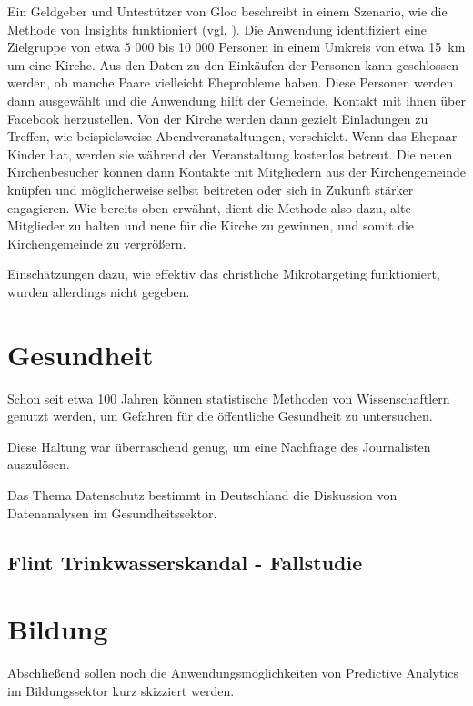 Ein Geldgeber und Untestützer von Gloo beschreibt in einem Szenario, wie die Methode von Insights funktioniert (vgl. \cite{Viken}).
Die Anwendung identifiziert eine Zielgruppe von etwa 5 000 bis 10 000 Personen in einem Umkreis von etwa 15~km um eine Kirche.
Aus den Daten zu den Einkäufen der Personen kann geschlossen werden, ob manche Paare vielleicht Eheprobleme haben.
Diese Personen werden dann ausgewählt und die Anwendung hilft der Gemeinde, Kontakt mit ihnen über Facebook herzustellen.
Von der Kirche werden dann gezielt Einladungen zu Treffen, wie beispielsweise Abendveranstaltungen, verschickt. Wenn das Ehepaar
Kinder hat, werden sie während der Veranstaltung kostenlos betreut. Die neuen Kirchenbesucher können dann Kontakte mit
Mitgliedern aus der Kirchengemeinde knüpfen und möglicherweise selbst beitreten oder sich in Zukunft stärker engagieren.
Wie bereits oben erwähnt, dient die Methode also dazu, alte Mitglieder zu halten und neue für die Kirche zu gewinnen,
und somit die Kirchengemeinde zu vergrößern.

Einschätzungen dazu, wie effektiv das christliche Mikrotargeting funktioniert, wurden allerdings nicht gegeben.

\section{Gesundheit}

Schon seit etwa 100 Jahren können statistische Methoden von Wissenschaftlern
genutzt werden, um Gefahren für die öffentliche Gesundheit zu untersuchen.


Diese Haltung war überraschend genug, um eine Nachfrage des Journalisten
auszulösen.


Das Thema Datenschutz bestimmt in Deutschland die Diskussion von Datenanalysen
im Gesundheitssektor.



\subsection{Flint Trinkwasserskandal - Fallstudie}

\section{Bildung}
Abschließend sollen noch die Anwendungsmöglichkeiten von Predictive Analytics
im Bildungssektor kurz skizziert werden.

